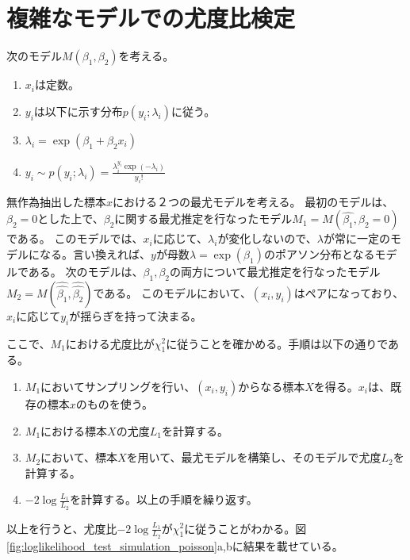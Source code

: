 \section{複雑なモデルでの尤度比検定}
次のモデル$M(\beta_1,\beta_2)$を考える。
\begin{enumerate}
    \item $x_i$は定数。
    \item $y_i$は以下に示す分布$p(y_i;\lambda_i)$に従う。
    \item $\lambda_i = \exp(\beta_1+\beta_2 x_i)$
    \item $y_i \sim p(y_i;\lambda_i) = \frac{\lambda_i^{y_i}\exp(-\lambda_i)}{y_i!}$
\end{enumerate}
無作為抽出した標本$x$における２つの最尤モデルを考える。
最初のモデルは、$\beta_2=0$とした上で、$\beta_2$に関する最尤推定を行なったモデル$M_1=M(\hat{\beta_1},\beta_2=0)$である。
このモデルでは、$x_i$に応じて、$\lambda_i$が変化しないので、$\lambda$が常に一定のモデルになる。言い換えれば、$y$が母数$\lambda=\exp(\beta_1)$のポアソン分布となるモデルである。
次のモデルは、$\beta_1,\beta_2$の両方について最尤推定を行なったモデル$M_2=M(\hat{\hat{\beta_1}},\hat{\hat{\beta_2}})$である。
このモデルにおいて、$(x_i,y_i)$はペアになっており、$x_i$に応じて$y_i$が揺らぎを持って決まる。

ここで、$M_1$における尤度比が$\chi_1^2$に従うことを確かめる。手順は以下の通りである。
\begin{enumerate}
    \item $M_1$においてサンプリングを行い、$(x_i,y_i)$からなる標本$X$を得る。$x_i$は、既存の標本$x$のものを使う。%
    \item $M_1$における標本$X$の尤度$L_1$を計算する。
    \item $M_2$において、標本$X$を用いて、最尤モデルを構築し、そのモデルで尤度$L_2$を計算する。
    \item $-2\log\frac{L_1}{L_2}$を計算する。以上の手順を繰り返す。
\end{enumerate}
以上を行うと、尤度比$-2\log\frac{L_1}{L_2}$が$\chi^2_1$に従うことがわかる。図\ref{fig:loglikelihood_test_simulation_poisson}a,bに結果を載せている。


